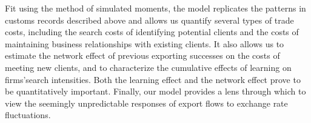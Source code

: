 Fit using the method of simulated moments, the model replicates the patterns
in customs records described above and allows us quantify several types of
trade costs, including the search costs of identifying potential clients and
the costs of maintaining business relationships with existing clients. It
also allows us to estimate the network effect of previous exporting
successes on the costs of meeting new clients, and to characterize the
cumulative effects of learning on firms'search intensities. Both the
learning effect and the network effect prove to be quantitatively important.
Finally, our model provides a lens through which to view the seemingly
unpredictable responses of export flows to exchange rate fluctuations.

